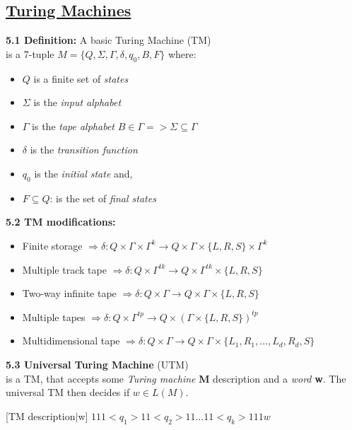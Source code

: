 \documentclass{article}
\begin{document}
\begin{multicols}{2}
\section{\underline{Turing Machines}}

\textbf{5.1 Definition:} A basic Turing Machine (TM)\\
is a 7-tuple $M = \{Q, \Sigma, \Gamma, \delta, q_0, B, F\}$ where:
\begin{itemize}
    \setlength\itemsep{-0.4em}
    \item $Q$ is a finite set of \textit{states}
    \item $\Sigma$ is the \textit{input alphabet} 
    \item $\Gamma$ is the \textit{tape alphabet} \small{$B \in \Gamma => \Sigma \subseteq \Gamma$}
    \item $\delta$ is the \textit{transition function}
    \item $q_0$ is the \textit{initial state} and,
    \item $F \subseteq Q$: is the set of \textit{final states}
\end{itemize}

\textbf{5.2 TM modifications:}\\
\begin{itemize}
    \setlength\itemsep{-0.4em}
    \item Finite storage $\Rightarrow \delta: Q \times \Gamma \times \Gamma^k \rightarrow Q \times \Gamma \times \{L, R, S\} \times \Gamma^k$
    \item Multiple track tape $\Rightarrow \delta: Q \times  \Gamma^{tk} \rightarrow Q \times \Gamma^{tk} \times \{L, R, S\}$
    \item Two-way infinite tape $\Rightarrow \delta: Q \times  \Gamma \rightarrow Q \times \Gamma \times \{L, R, S\}$
    \item Multiple tapes $\Rightarrow \delta: Q \times  \Gamma^{tp} \rightarrow Q \times (\Gamma \times \{L, R, S\})^{tp}$
    \item Multidimensional tape $\Rightarrow \delta: Q \times  \Gamma \rightarrow Q \times \Gamma \times \{L_1, R_1, \dots, L_d, R_d, S\}$
\end{itemize}

\textbf{5.3 Universal Turing Machine} (UTM)\\
is a TM, that accepts some \textit{Turing machine} \textbf{M} description and a \textit{word} \textbf{w}. 
The universal TM then decides if $w \in L(M)$.\smallskip

[TM description$|$w]
$111<q_1>11<q_2>11\dots11<q_k>111w$ \smallskip


\end{multicols}
\end{document}
